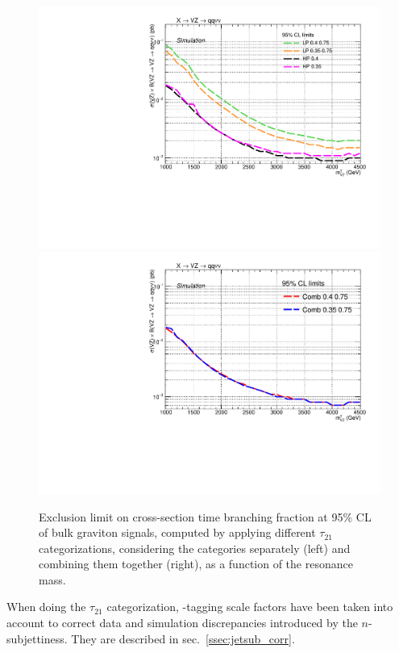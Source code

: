  \begin{figure}[!htb]
   \begin{center}

     \includegraphics[width=.5\textwidth]{TestPurity/Exclusion_purityTest_LPHP_test.pdf}%
     \includegraphics[width=.5\textwidth]{TestPurity/Exclusion_purityTest_comb_test.pdf}
   \end{center}
   \caption{Exclusion limit on cross-section time branching fraction at 95\% CL of bulk graviton signals, computed by applying different $\tau_{21}$ categorizations, considering the categories separately (left) and combining them together (right), as a function of the resonance mass.}
   \label{fig:test_exclusion}
 \end{figure}


\noindent When doing the $\tau_{21}$ categorization, \V-tagging scale factors have been taken into account to correct data and simulation discrepancies introduced by the $n$-subjettiness. They are described in sec.~\ref{ssec:jetsub_corr}.

